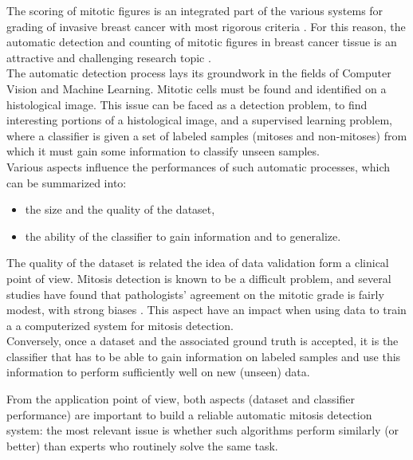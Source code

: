 \vspace{0.6cm}

The scoring of mitotic figures is an integrated part of the various systems for grading of invasive breast cancer with most rigorous criteria \cite{breastCancerGrading01}.
For this reason, the automatic detection and counting of mitotic figures in breast cancer tissue is an attractive and challenging research
topic \cite{Mitosis01}.\\
The automatic detection process lays its groundwork in the fields of Computer Vision and Machine Learning\cite{mitosisBreastCancerImagingAlgorithmsTHESIS}.
Mitotic cells must be found and identified on a histological image. This issue can be faced as a
detection problem, to find interesting portions of a histological image, and a supervised learning problem, where a classifier
is given a set of labeled samples (mitoses and non-mitoses) from which it must gain some information to classify unseen samples.\\


\noindent Various aspects influence the performances of such automatic processes, which can be summarized into:

\begin{itemize}
 \item the size and the quality of the dataset,
 \item the ability of the classifier to gain information and to generalize.
\end{itemize}

The quality of the dataset is related the idea of data validation form a clinical point of view. Mitosis detection is known to be
a difficult problem, and several studies have found that pathologists' agreement on the mitotic grade is fairly modest, with strong biases \cite{mitoticRecognition03Agreement}.
This aspect have an impact when using data to train a a computerized system for mitosis detection.\\
Conversely, once a dataset and the associated ground truth is accepted, it is the classifier that has to be able to gain information on labeled samples and
use this information to perform sufficiently well on new (unseen) data.

\vspace{0.6cm}

From the application point of view, both aspects (dataset and classifier performance) are important to build a reliable automatic mitosis detection system:
the most relevant issue is whether such algorithms perform similarly (or better) than experts who routinely solve the same task.

